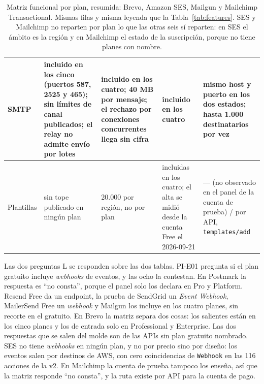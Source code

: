 \begin{table}[H]
\begin{tabular}{|p{2cm}|p{3cm}|p{3cm}|p{3cm}|p{3.1cm}|}
\hline
SMTP & incluido en los cinco (puertos 587, 2525 y 465); sin límites de canal publicados; el relay no admite envío por lotes & incluido en los cuatro; 40 MB por mensaje; el rechazo por conexiones concurrentes llega sin cifra & incluido en los cuatro & mismo host y puerto en los dos estados; hasta 1.000 destinatarios por vez \\
\hline
Plantillas & sin tope publicado en ningún plan & 20.000 por región, no por plan & incluidas en los cuatro; el alta se midió desde la cuenta Free el 2026-09-21 & --- (no observado en el panel de la cuenta de prueba) / por API, \texttt{templates/add} \\
\hline
\end{tabular}
\caption{Matriz funcional por plan, resumida: Brevo, Amazon SES, Mailgun y Mailchimp
Transactional. Mismas filas y misma leyenda que la Tabla~\ref{tab:features}. SES y
Mailchimp no reparten por plan lo que las otras seis sí reparten: en SES el ámbito es la
región y en Mailchimp el estado de la suscripción, porque no tiene planes con nombre.}
\label{tab:features-2}
\end{table}

Las dos preguntas L se responden sobre las dos tablas. PI-E01 pregunta si el plan
gratuito incluye \textit{webhooks} de eventos, y las ocho la contestan. En Postmark la
respuesta es ``no consta'', porque el panel solo los declara en Pro y Platform. Resend
Free da un endpoint, la prueba de SendGrid un \textit{Event Webhook}, MailerSend
Free un \textit{webhook} y Mailgun los incluye en los cuatro planes, sin recorte en el
gratuito. En Brevo la matriz separa dos cosas: los salientes están en los cinco planes
y los de entrada solo en Professional y Enterprise.
Las dos respuestas que se salen del molde son de las APIs sin plan gratuito nombrado. SES
no tiene \textit{webhooks} en ningún plan, y no por precio sino por diseño: los eventos
salen por destinos de AWS, con cero coincidencias de \texttt{Webhook} en las 116 acciones
de la v2. En Mailchimp la cuenta de prueba tampoco los enseña, así que la matriz responde
``no consta'', y la ruta existe por API para la cuenta de pago.

